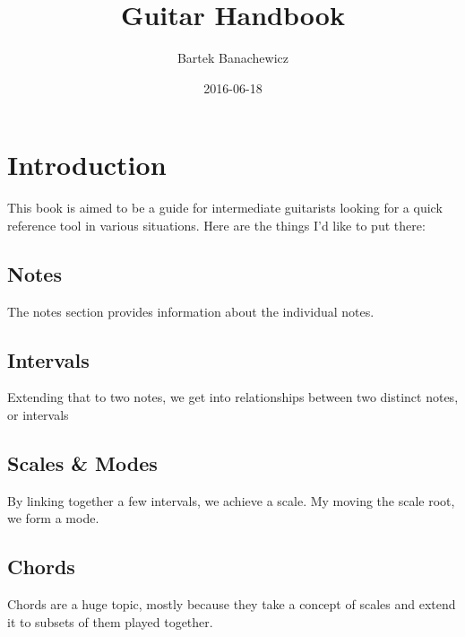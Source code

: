 \documentclass{article}
\title{Guitar Handbook}
\date{2016-06-18}
\author{Bartek Banachewicz}
\begin{document}
\maketitle
\newpage

\section{Introduction}
\noindent
This book is aimed to be a guide for intermediate guitarists looking for a quick reference tool in various situations.
Here are the things I'd like to put there:

\subsection{Notes}
The notes section provides information about the individual notes.
\subsection{Intervals}
Extending that to two notes, we get into relationships between two distinct notes, or intervals
\subsection{Scales \& Modes}
By linking together a few intervals, we achieve a scale. My moving the scale root, we form a mode.
\subsection{Chords}
Chords are a huge topic, mostly because they take a concept of scales and extend it to subsets of them played together.





\end{document}
